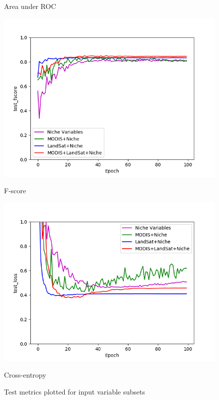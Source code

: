 \def\year{2017}\relax \documentclass[letterpaper]{article}
\begin{document}
\begin{figure}
\begin{minipage}{.24\textwidth}
\caption{Area under ROC}\label{fig:subsetauc}
\end{minipage}
\begin{minipage}{.24\textwidth}
  \centering
\includegraphics[width=\textwidth]{pics/test_fscore_variables.png}
\caption{F-score}\label{fig:subsetfscore}
\end{minipage}
\begin{minipage}{.01\textwidth}
\end{minipage}
\begin{minipage}{.24\textwidth}
  \centering
\includegraphics[width=\textwidth]{pics/test_loss_variables.png}
\caption{Cross-entropy}\label{fig:subsetloss}
\end{minipage}
\caption{Test metrics plotted for input variable subsets}\label{fig:testmetrics}
\end{figure}
\end{document}
